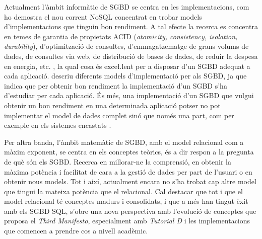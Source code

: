 \todo{}

Actualment l'àmbit informàtic de SGBD se centra en les
implementacions, com ho demostra el nou corrent NoSQL concentrat en
trobar models d'implementacions que tinguin bon rendiment. A tal
efecte la recerca es concentra en temes de garantia de propietats ACID
(\emph{atomicity, consistency, isolation, durability}), d'optimització
de consultes, d'emmagatzematge de grans volums de dades, de consultes
via web, de distribució de bases de dades, de reduir la despesa en
energia, etc. \parencite{stonebraker07,stonebraker10}, la qual cosa és
exce\l.lent per a disposar d'un SGBD adequat a cada aplicació.
\textcite{haerder05:_dbms_archit} descriu diferents models
d'implementació per als SGBD, ja que indica que per obtenir bon
rendiment la implementació d'un SGBD s'ha d'estudiar per cada
aplicació. És més, una implementació d'un SGBD que vulgui obtenir un
bon rendiment en una determinada aplicació potser no pot implementar
el model de dades complet sinó que només una part, com per exemple en
els sistemes
encastats \parencite{saake09:_downs_data_manag_embed_system}.

Per altra banda, l'àmbit matemàtic de SGBD, amb el model relacional
com a màxim exponent, se centra en els conceptes teòrics, és a dir
respon a la pregunta de què són els SGBD. Recerca en millorar-ne la
comprensió, en obtenir la màxima potència i facilitat de cara a la
gestió de dades per part de l'usuari o en obtenir nous models. Tot i
així, actualment encara no s'ha trobat cap altre model que tingui la
mateixa potència que el relacional. Cal destacar que tot i que el
model relacional té conceptes madurs i consolidats, i que a més han
tingut èxit amb els SGBD SQL, s'obre una nova perspectiva amb
l'evolució de conceptes que proposa el \emph{Third Manifesto},
especialment amb \emph{Tutorial D} i les implementacions que comencen a prendre
cos a nivell acadèmic.




















